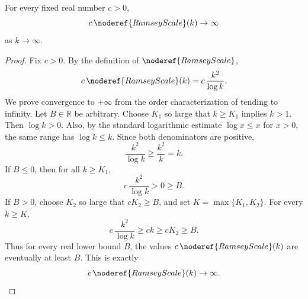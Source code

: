 \begin{helper}
For every fixed real number \(c>0\),
\[
c\,\noderef{RamseyScale}(k)\to\infty
\]
as \(k\to\infty\).
\end{helper}
\begin{proof}
Fix \(c>0\).  By the definition of \(\noderef{RamseyScale}\),
\[
c\,\noderef{RamseyScale}(k)=c\,\frac{k^2}{\log k}.
\]
We prove convergence to \(+\infty\) from the order characterization of
tending to infinity.  Let \(B\in\mathbb R\) be arbitrary.  Choose \(K_1\) so
large that \(k\ge K_1\) implies \(k>1\).  Then \(\log k>0\).  Also, by the
standard logarithmic estimate \(\log x\le x\) for \(x>0\), the same range has
\(\log k\le k\).  Since both denominators are positive,
\[
\frac{k^2}{\log k}\ge \frac{k^2}{k}=k .
\]
If \(B\le0\), then for all \(k\ge K_1\),
\[
c\,\frac{k^2}{\log k}>0\ge B.
\]
If \(B>0\), choose \(K_2\) so large that \(cK_2\ge B\), and set
\(K=\max\{K_1,K_2\}\).  For every \(k\ge K\),
\[
c\,\frac{k^2}{\log k}\ge ck\ge cK_2\ge B.
\]
Thus for every real lower bound \(B\), the values
\(c\,\noderef{RamseyScale}(k)\) are eventually at least \(B\).  This is exactly
\[
c\,\noderef{RamseyScale}(k)\to\infty .
\]
\end{proof}
